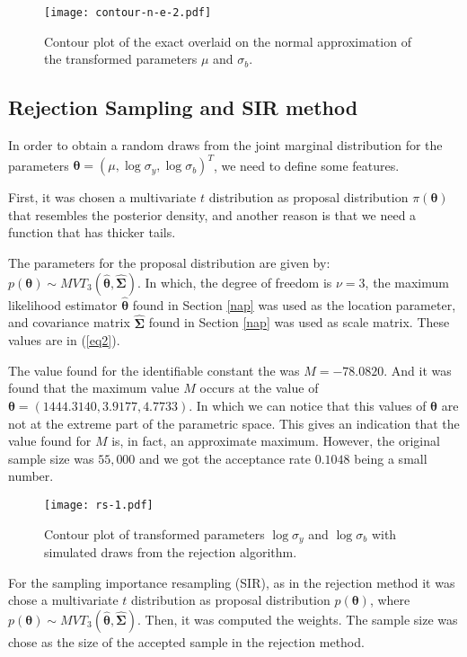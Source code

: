 \documentclass{asaproc}
\begin{document}
\begin{figure}[H]
\centering
\caption{Contour plot of the exact overlaid on the normal approximation of the transformed parameters $\mu$ and $\sigma_b$.}
\label{Fig5}
\texttt{[image: contour-n-e-2.pdf]}
\end{figure}

\subsection{Rejection Sampling and SIR method}

In order to obtain a random draws from the joint marginal distribution for the parameters $\boldsymbol{\theta} = (\mu, \log\sigma_y, \log\sigma_b)^T$, we need to define some features.

First, it was chosen a multivariate $t$ distribution as proposal distribution $\pi(\boldsymbol{\theta})$ that resembles the posterior density, and another reason is that we need a function that has thicker tails.

The parameters for the proposal distribution are given by: $p(\boldsymbol{\theta}) \sim MVT_{3}(\boldsymbol{\hat{\theta}}, \boldsymbol{\hat{\Sigma}})$. In which, the degree of freedom is $\nu = 3$, the maximum likelihood estimator $\boldsymbol{\hat{\theta}}$ found in Section \ref{nap} was used as the location parameter, and covariance matrix $\boldsymbol{\hat{\Sigma}}$ found in Section \ref{nap}  was used as scale matrix. These values are in (\ref{eq2}).

The value found for the identifiable constant the was $M = -78.0820$. And it was found that the maximum value $M$ occurs at the value of $\boldsymbol{\theta} = ( 1444.3140,  3.9177,  4.7733)$. In which we can notice that this values of $\boldsymbol{\theta}$ are not at the extreme part of the parametric space. This gives an indication that the value found for $M$ is, in fact, an approximate maximum. However, the original sample size was $55,000$ and we got the acceptance rate $0.1048$ being a small number.

\begin{figure}[H]
\centering
\caption{Contour plot of transformed parameters $\log\sigma_y$ and $\log\sigma_b$ with simulated draws from the rejection algorithm.}
\label{Figrs}
\texttt{[image: rs-1.pdf]}
\end{figure}

For the sampling importance resampling (SIR), as in the rejection method it was chose a multivariate $t$ distribution as proposal distribution $p(\boldsymbol{\theta})$, where $p(\boldsymbol{\theta}) \sim MVT_{3}(\boldsymbol{\hat{\theta}}, \boldsymbol{\hat{\Sigma}})$. Then, it was computed the weights. The sample size was chose as the size of the accepted sample in the rejection method.
\end{document}
